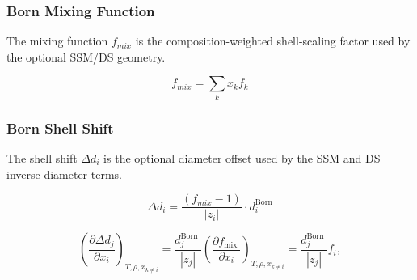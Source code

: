 \documentclass[12pt, letterpaper]{article}
\begin{document}
\subsubsection{Born Mixing Function}

The mixing function \(f_{mix}\) is the composition-weighted shell-scaling factor used by the optional SSM/DS geometry.

\begin{equation}
    f_{mix}=\sum_{k}x_{k}f_{k}
    \label{eq:f_mix}
\end{equation}

\subsubsection{Born Shell Shift}

The shell shift \(\Delta d_i\) is the optional diameter offset used by the SSM and DS inverse-diameter terms.

\begin{equation}
    \Delta d_{i}=\frac{(f_{mix}-1)}{|z_{i}|}\cdot d_{i}^{\mathrm{Born}}
    \label{eq:delta_d_born}
\end{equation}


\begin{equation}
    \left(\frac{\partial \Delta d_{j}}{\partial x_{i}}\right)_{T,\rho,x_{k\neq i}}
    =\frac{d_{j}^{\text {Born }}}{\left|z_{j}\right|} \left(\frac{\partial f_{\text {mix }}}{\partial x_{i}}\right)_{T,\rho,x_{k\neq i}}
    =\frac{d_{j}^{\text {Born }}}{\left|z_{j}\right|} f_{i},
    \label{eq:ddelta_d_dxi}
\end{equation}
\end{document}
